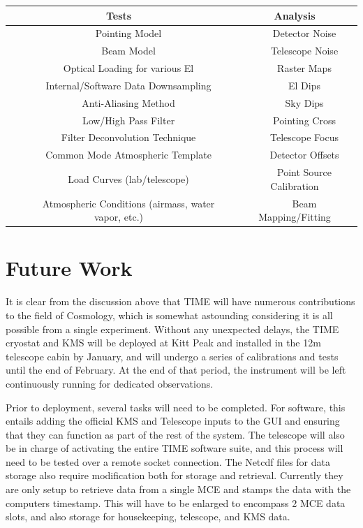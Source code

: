 \documentclass[manuscript]{aastex}
\newcommand{\tabitem}{~~\llap{\textbullet}~~}
\begin{document}
\begin{center}
\begin{tabular}{|c|c|}
\hline
\textbf{Tests} & \textbf{Analysis}\\
\hline
\hline
  \tabitem Pointing Model & \tabitem Detector Noise\\
  \tabitem Beam Model & \tabitem Telescope Noise\\
  \tabitem Optical Loading for various El & \tabitem Raster Maps\\
  \tabitem Internal/Software Data Downsampling & \tabitem El Dips\\
  \tabitem Anti-Aliasing Method & \tabitem Sky Dips\\
  \tabitem Low/High Pass Filter & \tabitem Pointing Cross\\
  \tabitem Filter Deconvolution Technique & \tabitem Telescope Focus\\
  \tabitem Common Mode Atmospheric Template & \tabitem Detector Offsets\\
  \tabitem Load Curves (lab/telescope) & \tabitem Point Source Calibration\\
  \tabitem Atmospheric Conditions (airmass, water vapor, etc.) & \tabitem Beam Mapping/Fitting\\
\hline
\end{tabular}\label{table:pipeline}
\end{center}

\section{\textbf{Future Work}}

It is clear from the discussion above that TIME will have numerous contributions to the field of Cosmology, which is somewhat astounding considering it is all possible from a single experiment. Without any unexpected delays, the TIME cryostat and KMS will be deployed at Kitt Peak and installed in the 12m telescope cabin by January, and will undergo a series of calibrations and tests until the end of February. At the end of that period, the instrument will be left continuously running for dedicated observations. 

Prior to deployment, several tasks will need to be completed. For software, this entails adding the official KMS and Telescope inputs to the GUI and ensuring that they can function as part of the rest of the system. The telescope will also be in charge of activating the entire TIME software suite, and this process will need to be tested over a remote socket connection. The Netcdf files for data storage also require modification both for storage and retrieval. Currently they are only setup to retrieve data from a single MCE and stamps the data with the computers timestamp. This will have to be enlarged to encompass 2 MCE data slots, and also storage for housekeeping, telescope, and KMS data. 
\end{document}
